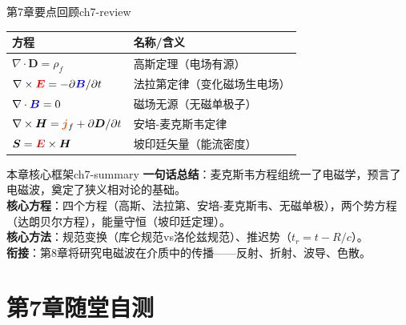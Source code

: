 \documentclass[11pt,a4paper,openany,oneside]{book}
\newcommand{\vecE}{\textcolor{red}{\vect{E}}}
\newcommand{\vecB}{\textcolor{blue}{\vect{B}}}
\newcommand{\vecJ}{\textcolor{cororange}{\vect{j}}}
\newcommand{\vect}[1]{\bm{#1}}
\newcommand{\curl}{\nabla\times}
\newcommand{\divg}{\nabla\cdot}
\begin{document}
\begin{review}{第7章要点回顾}{ch7-review}
\begin{center}
\begin{tabular}{@{}ll@{}}
\toprule
\textbf{方程} & \textbf{名称/含义} \\
\midrule
$\divg\vect{D} = \rho_f$ & 高斯定理（电场有源） \\
$\curl\vecE = -\partial\vecB/\partial t$ & 法拉第定律（变化磁场生电场） \\
$\divg\vecB = 0$ & 磁场无源（无磁单极子） \\
$\curl\vect{H} = \vecJ_f + \partial\vect{D}/\partial t$ & 安培-麦克斯韦定律 \\
$\vect{S} = \vecE \times \vect{H}$ & 坡印廷矢量（能流密度） \\
\bottomrule
\end{tabular}
\end{center}
\end{review}

\begin{tip}{本章核心框架}{ch7-summary}
\textbf{一句话总结}：麦克斯韦方程组统一了电磁学，预言了电磁波，奠定了狭义相对论的基础。\\
\textbf{核心方程}：四个方程（高斯、法拉第、安培-麦克斯韦、无磁单极），两个势方程（达朗贝尔方程），能量守恒（坡印廷定理）。\\
\textbf{核心方法}：规范变换（库仑规范vs洛伦兹规范）、推迟势（$t_r=t-R/c$）。\\
\textbf{衔接}：第8章将研究电磁波在介质中的传播——反射、折射、波导、色散。
\end{tip}

\section*{第7章随堂自测}
\end{document}
